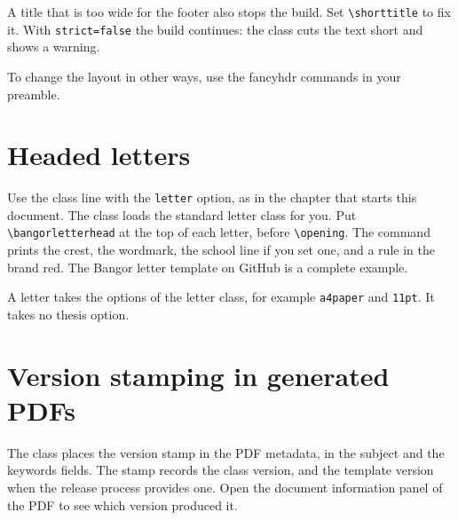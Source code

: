 \documentclass[dissertation,tables,glossary,12pt,a4paper]{bangor}
\begin{document}
A title that is too wide for the footer also stops the build. Set \verb|\shorttitle| to fix it. With \verb|strict=false| the build continues: the class cuts the text short and shows a warning.

To change the layout in other ways, use the \textsf{fancyhdr} commands in your preamble.

\chapter{Headed letters}
Use the class line with the \verb|letter| option, as in the chapter that starts this document. The class loads the standard \textsf{letter} class for you. Put \verb|\bangorletterhead| at the top of each letter, before \verb|\opening|. The command prints the crest, the wordmark, the school line if you set one, and a rule in the brand red. The Bangor letter template on GitHub is a complete example.

A letter takes the options of the \textsf{letter} class, for example \verb|a4paper| and \verb|11pt|. It takes no thesis option.

\chapter{Version stamping in generated PDFs}
The class places the version stamp in the PDF metadata, in the subject and the keywords fields. The stamp records the class version, and the template version when the release process provides one. Open the document information panel of the PDF to see which version produced it.
\end{document}
